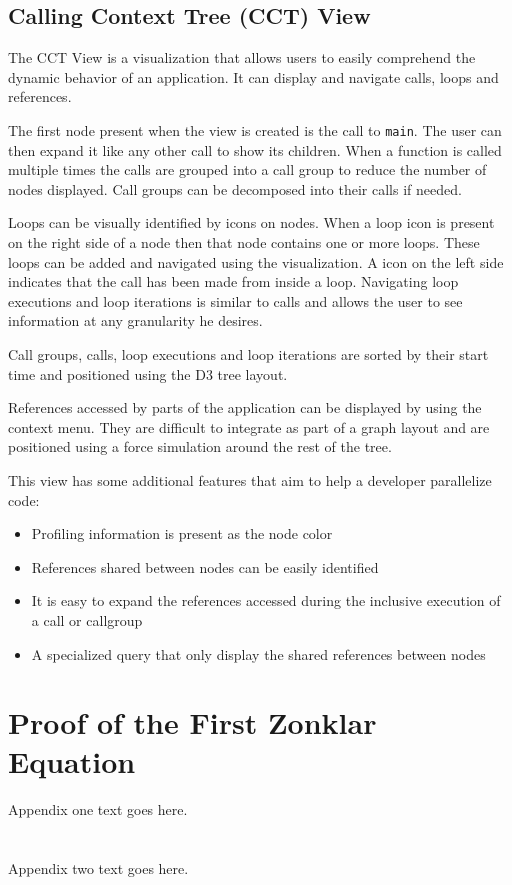 \documentclass[conference]{IEEEtran}
\begin{document}
\subsection{Calling Context Tree (CCT) View}

The CCT View is a visualization that allows users to easily comprehend the dynamic behavior of an application. It can display and navigate calls, loops and references.

The first node present when the view is created is the call to \texttt{main}. The user can then expand it like any other call to show its children. When a function is called multiple times the calls are grouped into a call group to reduce the number of nodes displayed. Call groups can be decomposed into their calls if needed.

Loops can be visually identified by icons on nodes. When a loop icon is present on the right side of a node then that node contains one or more loops. These loops can be added and navigated using the visualization. A icon on the left side indicates that the call has been made from inside a loop. Navigating loop executions and loop iterations is similar to calls and allows the user to see information at any granularity he desires.

Call groups, calls, loop executions and loop iterations are sorted by their start time and positioned using the D3 tree layout.

References accessed by parts of the application can be displayed by using the context menu. They are difficult to integrate as part of a graph layout and are positioned using a force simulation around the rest of the tree.

This view has some additional features that aim to help a developer parallelize code:

\begin{itemize}
	\item Profiling information is present as the node color
	\item References shared between nodes can be easily identified
	\item It is easy to expand the references accessed during the inclusive execution of a call or callgroup
	\item A specialized query that only display the shared references between nodes
\end{itemize}

\appendices
\section{Proof of the First Zonklar Equation}
Appendix one text goes here.

\section{}
Appendix two text goes here.

\ifCLASSOPTIONcaptionsoff
  \newpage
\fi
\end{document}
